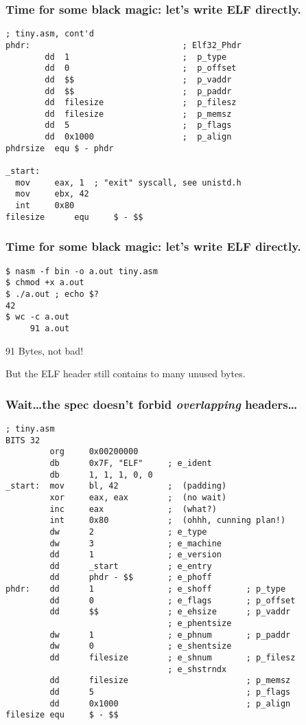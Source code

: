 \documentclass{beamer}
\begin{document}
\begin{frame}[fragile]
\frametitle{Time for some black magic: let's write ELF directly.}
\begin{lstlisting}[basicstyle=\scriptsize\ttfamily]
; tiny.asm, cont'd
phdr:                               ; Elf32_Phdr
        dd  1                       ;  p_type
        dd  0                       ;  p_offset
        dd  $$                      ;  p_vaddr
        dd  $$                      ;  p_paddr
        dd  filesize                ;  p_filesz
        dd  filesize                ;  p_memsz
        dd  5                       ;  p_flags
        dd  0x1000                  ;  p_align
phdrsize  equ $ - phdr

_start:
  mov     eax, 1  ; "exit" syscall, see unistd.h
  mov     ebx, 42
  int     0x80
filesize      equ     $ - $$
\end{lstlisting}
\end{frame}

\begin{frame}[fragile]
\frametitle{Time for some black magic: let's write ELF directly.}
\begin{lstlisting}
$ nasm -f bin -o a.out tiny.asm
$ chmod +x a.out
$ ./a.out ; echo $?
42
$ wc -c a.out
     91 a.out
\end{lstlisting}
91 Bytes, not bad!

But the ELF header still contains to many unused bytes.
\end{frame}

\begin{frame}[fragile]
\frametitle{Wait\ldots the spec doesn't forbid \emph{overlapping} headers\ldots}
\begin{lstlisting}[basicstyle=\tiny\ttfamily]
; tiny.asm
BITS 32
         org     0x00200000
         db      0x7F, "ELF"     ; e_ident
         db      1, 1, 1, 0, 0
_start:  mov     bl, 42          ;  (padding)
         xor     eax, eax        ;  (no wait)
         inc     eax             ;  (what?)
         int     0x80            ;  (ohhh, cunning plan!)
         dw      2               ; e_type
         dw      3               ; e_machine
         dd      1               ; e_version
         dd      _start          ; e_entry
         dd      phdr - $$       ; e_phoff
phdr:    dd      1               ; e_shoff       ; p_type
         dd      0               ; e_flags       ; p_offset
         dd      $$              ; e_ehsize      ; p_vaddr
                                 ; e_phentsize
         dw      1               ; e_phnum       ; p_paddr
         dw      0               ; e_shentsize
         dd      filesize        ; e_shnum       ; p_filesz
                                 ; e_shstrndx
         dd      filesize                        ; p_memsz
         dd      5                               ; p_flags
         dd      0x1000                          ; p_align
filesize equ     $ - $$
\end{lstlisting}
\end{frame}
\end{document}
